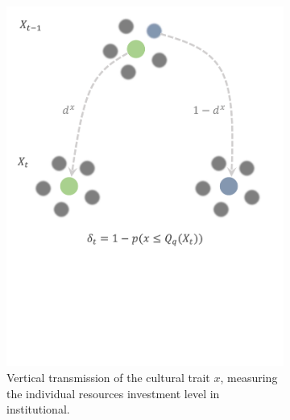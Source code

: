 \documentclass[a4paper]{article}
\begin{document}
\begin{figure}[!htbp]
	\centering
	\begin{subfigure}{.5\textwidth}
		\centering
		\captionsetup{width=.9\linewidth}
		\includegraphics[width=.9\linewidth]{xTransmission.pdf}
		\caption{Vertical transmission of the cultural trait $x$, measuring the individual resources investment level in institutional.}
		\label{fig:xtrans}
	\end{subfigure}%
	\begin{subfigure}{.5\textwidth}
		\centering
		\captionsetup{width=.9\linewidth}

\end{subfigure}
\end{figure}
\end{document}
